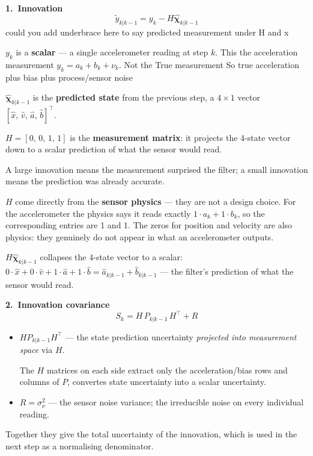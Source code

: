 \documentclass[12pt, a4paper]{article}
\begin{document}
\textbf{1.\ Innovation}
\[
  \tilde{y}_{k|k-1} = y_k - H\hat{\boldsymbol{\chi}}_{k|k-1}
\]
could you add underbrace here to say predicted measurement under H and x

$y_k$ is a \textbf{scalar} --- a single accelerometer reading at step $k$.
This the acceleration measurement $y_k = a_k + b_k + \nu_k$. Not the True measurement
So true acceleration plus bias plus process/sensor noise

$\hat{\boldsymbol{\chi}}_{k|k-1}$ is the \textbf{predicted state} from the
previous step, a $4\times1$ vector $[\hat{x},\,\hat{v},\,\hat{a},\,\hat{b}]^\top$.

$H = [0,\,0,\,1,\,1]$ is the \textbf{measurement matrix}: it projects
the 4-state vector down to a scalar prediction of what the sensor
would read.

A large innovation means the measurement surprised the filter;
a small innovation means the prediction was already accurate.

\begin{notebox}
    $H$ come directly from the \textbf{sensor physics} ---
they are not a design choice.
For the accelerometer the physics says it reads exactly
$1{\cdot}a_k + 1{\cdot}b_k$, so the corresponding entries are 1 and 1.
The zeros for position and velocity are also physics: they genuinely
do not appear in what an accelerometer outputs.
\end{notebox}

\begin{defbox}
    $H\hat{\boldsymbol{\chi}}_{k|k-1}$ collapses the 4-state vector to a scalar:
$0{\cdot}\hat{x} + 0{\cdot}\hat{v} + 1{\cdot}\hat{a} + 1{\cdot}\hat{b}
= \hat{a}_{k|k-1} + \hat{b}_{k|k-1}$ ---
the filter's prediction of what the sensor would read.
\end{defbox}

\clearpage
\medskip
\textbf{2.\ Innovation covariance}
\[
  S_k = H\,P_{k|k-1}\,H^\top + R
\]

\begin{itemize}[leftmargin=1.4em, topsep=2pt]
  \item $H P_{k|k-1} H^\top$ --- the state prediction uncertainty
        \emph{projected into measurement space} via $H$.

        The $H$ matrices on each side extract only the
        acceleration/bias rows and columns of $P$, convertes state
        uncertainty into a scalar uncertainty.
    \item $R = \sigma_\nu^2$ --- the sensor noise variance; the
        irreducible noise on every individual reading.
\end{itemize}
Together they give the total uncertainty of the innovation, which
is used in the next step as a normalising denominator.
\end{document}
